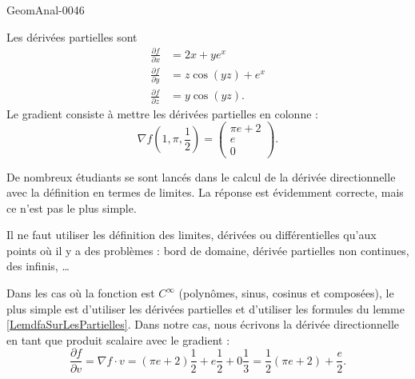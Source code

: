 \begin{corrige}{GeomAnal-0046}

    Les dérivées partielles sont
    \begin{subequations}
        \begin{align}
            \frac{ \partial f }{ \partial x }&=2x+y e^{x}\\
            \frac{ \partial f }{ \partial y }&=z\cos(yz)+e^x\\
            \frac{ \partial f }{ \partial z }&=y\cos(yz).
        \end{align}
    \end{subequations}
    Le gradient consiste à mettre les dérivées partielles en colonne :
    \begin{equation}
        \nabla f(1,\pi,\frac{ 1 }{2})=\begin{pmatrix}
            \pi e+2    \\ 
            e    \\ 
            0    
        \end{pmatrix}.
    \end{equation}

    De nombreux étudiants se sont lancés dans le calcul de la dérivée directionnelle avec la définition en termes de limites. La réponse est évidemment correcte, mais ce n'est pas le plus simple.

        Il ne faut utiliser les définition des limites, dérivées ou différentielles qu'aux points où il y a des problèmes : bord de domaine, dérivée partielles non continues, des infinis, \ldots

        Dans les cas où la fonction est $C^{\infty}$ (polynômes, sinus, cosinus et composées), le plus simple est d'utiliser les dérivées partielles et d'utiliser les formules du lemme \ref{LemdfaSurLesPartielles}. Dans notre cas, nous écrivons la dérivée directionnelle en tant que produit scalaire avec le gradient :
        \begin{equation}
            \frac{ \partial f }{ \partial v }=\nabla f\cdot v=(\pi e+2)\frac{ 1 }{2}+e\frac{ 1 }{2}+0\frac{1}{ 3 }=\frac{ 1 }{2}(\pi e+2)+\frac{ e }{2}.
        \end{equation}


\end{corrige}

